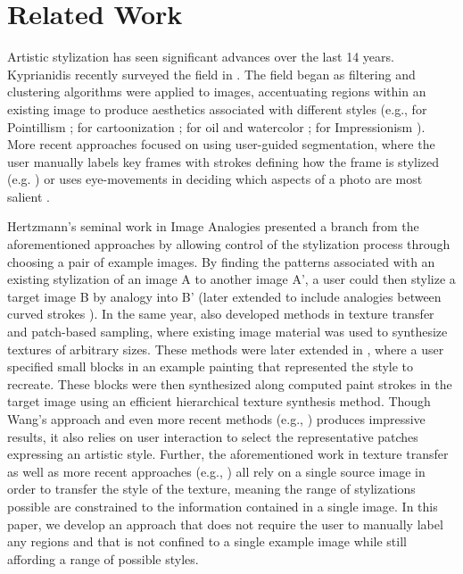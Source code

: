 \documentclass[a4paper,10pt,final]{ThesisStyle}
\begin{document}
\section{Related Work}  
Artistic stylization has seen significant advances over the last 14 years.  Kyprianidis recently surveyed the field in \cite{Kyprianidis2012}.  The field began as filtering and clustering algorithms were applied to images, accentuating regions within an existing image to produce aesthetics associated with different styles (e.g., for Pointillism \cite{Yang2006,Seo2010}; for cartoonization \cite{Wang2004}; for oil and watercolor \cite{Meier1996,Hertzmann2000,Bousseau2007,Gooch2002}; for Impressionism \cite{Litwinowicz1997,Hertzmann1998}).  More recent approaches focused on using user-guided segmentation, where the user manually labels key frames with strokes defining how the frame is stylized (e.g. \cite{O'Donovan2012}) or uses eye-movements in deciding which aspects of a photo are most salient \cite{DeCarlo2002}.

Hertzmann's seminal work in Image Analogies \cite{Hertzmann2001} presented a branch from the aforementioned approaches by allowing control of the stylization process through choosing a pair of example images.  By finding the patterns associated with an existing stylization of an image A to another image A', a user could then stylize a target image B by analogy into B' (later extended to include analogies between curved strokes \cite{Hertzmann2002}).  In the same year, \cite{Efros2001,Liang2001a} also developed methods in texture transfer and patch-based sampling, where existing image material was used to synthesize textures of arbitrary sizes.  These methods were later extended in \cite{Wang2004a}, where a user specified small blocks in an example painting that represented the style to recreate.  These blocks were then synthesized along computed paint strokes in the target image using an efficient hierarchical texture synthesis method.  Though Wang's approach and even more recent methods (e.g., \cite{Guo2006}) produces impressive results, it also relies on user interaction to select the representative patches expressing an artistic style.  Further, the aforementioned work in texture transfer as well as more recent approaches (e.g., \cite{Lee2010}) all rely on a single source image in order to transfer the style of the texture, meaning the range of stylizations possible are constrained to the information contained in a single image.  In this paper, we develop an approach that does not require the user to manually label any regions and that is not confined to a single example image while still affording a range of possible styles.  
\end{document}
